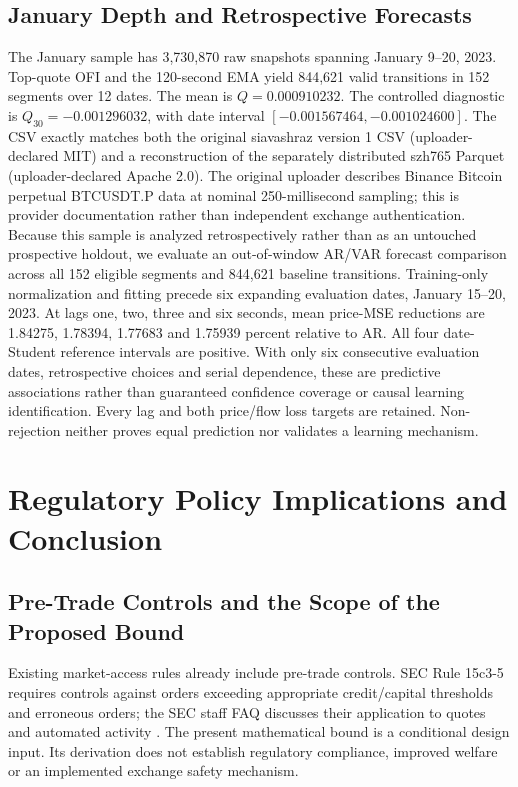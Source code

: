 \documentclass[12pt]{article}
\theoremstyle{definition}
\theoremstyle{remark}
\begin{document}
\subsection{January Depth and Retrospective Forecasts}
The January sample has 3,730,870 raw snapshots spanning January 9--20, 2023. Top-quote OFI and the 120-second EMA yield 844,621 valid transitions in 152 segments over 12 dates. The mean is $Q=0.000910232$. The controlled diagnostic is $Q_{30}=-0.001296032$, with date interval $[-0.001567464,-0.001024600]$. The CSV exactly matches both the original siavashraz version 1 CSV (uploader-declared MIT) and a reconstruction of the separately distributed szh765 Parquet (uploader-declared Apache 2.0). The original uploader describes Binance Bitcoin perpetual BTCUSDT.P data at nominal 250-millisecond sampling; this is provider documentation rather than independent exchange authentication. Because this sample is analyzed retrospectively rather than as an untouched prospective holdout, we evaluate an out-of-window AR/VAR forecast comparison across all 152 eligible segments and 844,621 baseline transitions. Training-only normalization and fitting precede six expanding evaluation dates, January 15--20, 2023. At lags one, two, three and six seconds, mean price-MSE reductions are 1.84275, 1.78394, 1.77683 and 1.75939 percent relative to AR. All four date-Student reference intervals are positive. With only six consecutive evaluation dates, retrospective choices and serial dependence, these are predictive associations rather than guaranteed confidence coverage or causal learning identification. Every lag and both price/flow loss targets are retained. Non-rejection neither proves equal prediction nor validates a learning mechanism.


\section{Regulatory Policy Implications and Conclusion}
\label{sec:policy_conclusion}

\subsection{Pre-Trade Controls and the Scope of the Proposed Bound}
Existing market-access rules already include pre-trade controls. SEC Rule 15c3-5 requires controls against orders exceeding appropriate credit/capital thresholds and erroneous orders; the SEC staff FAQ discusses their application to quotes and automated activity \citep{sec2010marketaccess,sec2017marketaccessfaq}. The present mathematical bound is a conditional design input. Its derivation does not establish regulatory compliance, improved welfare or an implemented exchange safety mechanism.
\end{document}
